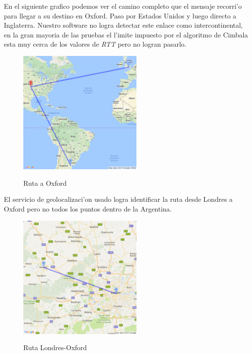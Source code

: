 En el siguiente grafico podemos ver el camino completo que el mensaje recorri'o para llegar a su destino en Oxford. Paso por Estados Unidos y luego directo a 
Inglaterra. Nuestro software no logra detectar este enlace como intercontinental, en la gran mayoria de las pruebas el l'imite impuesto por el algoritmo de
Cimbala esta muy cerca de los valores de \textit{RTT} pero no logran pasarlo.
\begin{figure}[H]
\centering
\caption{Ruta a Oxford}
\includegraphics[width=0.55\textwidth]{modules/oxford_path_1}
 \label{fig:ruta_oxford_1}
\end{figure}

El servicio de geolocalizaci'on usado logra identificar la ruta desde Londres a Oxford pero no todos los puntos dentro de la Argentina.
\begin{figure}[H]
\centering
\caption{Ruta Londres-Oxford}
\includegraphics[width=0.55\textwidth]{modules/oxford_path_2}
 \label{fig:ruta_oxford_2}
\end{figure}
